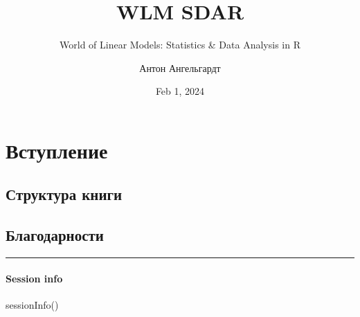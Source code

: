 \documentclass[
  letterpaper,
  DIV=11,
  numbers=noendperiod]{scrreprt}
\title{WLM SDAR}
\subtitle{World of Linear Models: Statistics \& Data Analysis in R}
\author{Антон Ангельгардт}
\date{Feb 1, 2024}
\newenvironment{Shaded}{}{}
\newcommand{\FunctionTok}[1]{\textcolor[rgb]{0.44,0.26,0.76}{#1}}
\newcommand{\NormalTok}[1]{\textcolor[rgb]{0.14,0.16,0.18}{#1}}
\renewcommand*\contentsname{Содержание}
\newcommand\contentsname{Содержание}
\theoremstyle{definition}
\theoremstyle{remark}
\begin{document}
\maketitle
\renewcommand*\contentsname{Содержание}
{
\hypersetup{linkcolor=}
\setcounter{tocdepth}{2}
\tableofcontents
}

\chapter*{Вступление}\label{preface}


\section*{Структура книги}\label{book_structure}


\section*{Благодарности}\label{thanks}


\begin{center}\rule{0.5\linewidth}{0.5pt}\end{center}

\subsubsection*{Session info}\label{session-info}

\begin{Shaded}
\begin{Highlighting}[]
\FunctionTok{sessionInfo}\NormalTok{()}
\end{Highlighting}
\end{Shaded}
\end{document}
